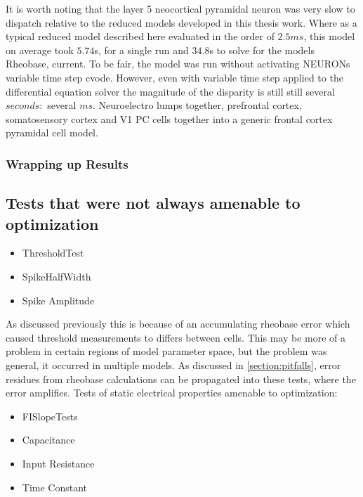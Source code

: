 It is worth noting that the layer 5 neocortical pyramidal neuron was very slow to dispatch relative to the reduced models developed in this thesis work. Where as a typical reduced model described here evaluated in the order of $2.5 ms$, this model on average took $5.74$s, for a single run and $34.8$s to solve for the models Rheobase, current. To be fair, the model was run without activating NEURONs variable time step cvode. However, even with variable time step applied to the differential equation solver the magnitude of the disparity is still still several $seconds:$ several $ ms$. Neuroelectro lumps together, prefrontal cortex, somatosensory cortex and V1 PC cells together into a generic frontal cortex pyramidal cell model.








\subsubsection{Wrapping up Results}

\subsection{Tests that were not always amenable to optimization}
\begin{itemize}
\item ThresholdTest
\item SpikeHalfWidth
\item Spike Amplitude
\end{itemize}
As discussed previously this is because of an accumulating rheobase error which caused threshold measurements to differs between cells. This may be more of a problem in certain regions of model parameter space, but the problem was general, it occurred in multiple models. As discussed in \ref{section:pitfalls}, error residues from rheobase calculations can be propagated into these tests, where the error amplifies.
Tests of static electrical properties amenable to optimization:
\begin{itemize}
\item FISlopeTests
\item Capacitance
\item Input Resistance
\item Time Constant 
\end{itemize}


